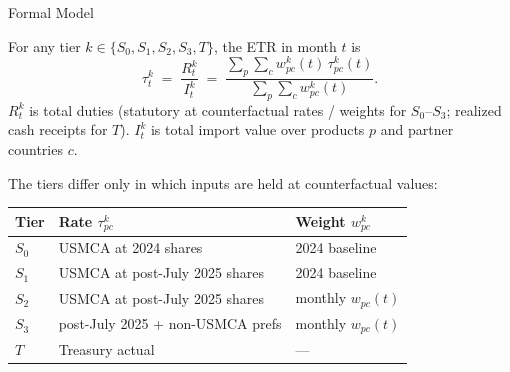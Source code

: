\documentclass[aspectratio=169,10pt]{beamer}
\newcommand{\tier}[1]{\textbf{\color{wblue}#1}}
\begin{document}
\begin{frame}{Formal Model}
\hypertarget{slide_formal_model}{}

\small

For any tier $k \in \{S_0, S_1, S_2, S_3, T\}$, the ETR in month $t$ is
\[
\tau^{k}_t \;=\; \frac{R^{k}_t}{I^{k}_t}
\;=\; \frac{\sum_p \sum_c w^{k}_{pc}(t)\,\tau^{k}_{pc}(t)}{\sum_p \sum_c w^{k}_{pc}(t)}.
\]
$R^{k}_t$ is total duties (statutory at counterfactual rates / weights for $S_0$--$S_3$; realized cash receipts for $T$). $I^{k}_t$ is total import value over products $p$ and partner countries $c$.

\medskip

The tiers differ only in which inputs are held at counterfactual values: \hyperlink{appendix_rates}{}

\begin{center}
\begin{tabular}{l l l}
\toprule
Tier & Rate $\tau^{k}_{pc}$        & Weight $w^{k}_{pc}$ \\
\midrule
\tier{$S_0$} & USMCA at 2024 shares                  & 2024 baseline \\
\tier{$S_1$} & USMCA at post-July 2025 shares        & 2024 baseline \\
\tier{$S_2$} & USMCA at post-July 2025 shares        & monthly $w_{pc}(t)$ \\
\tier{$S_3$} & post-July 2025 + non-USMCA prefs      & monthly $w_{pc}(t)$ \\
\tier{$T$}   & Treasury actual                       & --- \\
\bottomrule
\end{tabular}
\end{center}

\end{frame}
\end{document}
